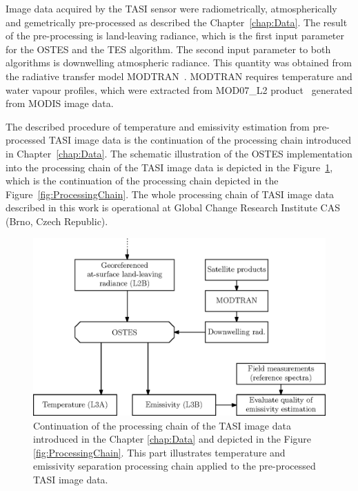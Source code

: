 Image data acquired by the TASI sensor were radiometrically, atmospherically and gemetrically pre-processed as described the Chapter~\ref{chap:Data}. The result of the pre-processing is land-leaving radiance, which is the first input parameter for the OSTES and the TES algorithm. The second input parameter to both algorithms is downwelling atmospheric radiance. This quantity was obtained from the radiative transfer model MODTRAN~\cite{BG06}. MODTRAN requires temperature and water vapour profiles, which were extracted from MOD07\_L2 product~\cite{B11} generated from MODIS image data.

The described procedure of temperature and emissivity estimation from pre-processed TASI image data is the continuation of the processing chain introduced in Chapter~\ref{chap:Data}. The schematic illustration of the OSTES implementation into the processing chain of the TASI image data is depicted in the Figure~\ref{fig:OSTESProcessingChain}, which is the continuation of the processing chain depicted in the Figure~\ref{fig:ProcessingChain}. The whole processing chain of TASI image data described in this work is operational at Global Change Research Institute CAS (Brno, Czech Republic).

\begin{figure}[thb]
	\centering
	\vspace{0.7 em}
	\includegraphics[scale=1]{pics/Chapter_04/OSTES_processing_chain.eps}
	\vspace{2 em}
	\caption{Continuation of the processing chain of the TASI image data introduced in the Chapter \ref{chap:Data} and depicted in the Figure \ref{fig:ProcessingChain}. This part illustrates temperature and emissivity separation processing chain applied to the pre-processed TASI image data.}
	\label{fig:OSTESProcessingChain}
	\vspace{0.7 em}
\end{figure}

